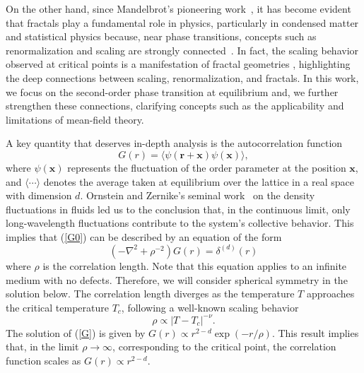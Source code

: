 \documentclass[pre,aps,twocolumn,showpacs,floatfix,nofootinbib,superscriptaddress,linenumbers]{revtex4-1}
\renewcommand{\vec}{\mathbf}
\begin{document}
On the other hand, since Mandelbrot's pioneering work~\cite{Mandelbrot82}, it has become evident that fractals play a fundamental role in physics, particularly in condensed matter and statistical physics because, near phase transitions, concepts such as renormalization and scaling are strongly connected~\cite{Cardy96}. In fact, the scaling behavior observed at critical points is a manifestation of fractal geometries \cite{Suzuki8, Kroger00,Devakul19}, highlighting the deep connections between scaling, renormalization, and fractals. In this work,  we focus on the second-order phase transition at equilibrium and, we further strengthen these connections, clarifying concepts such as the applicability and limitations of mean-field theory. 

A key quantity that deserves in-depth analysis is the autocorrelation function
\begin{equation}
\label{G0}
    G(r)=\langle \psi(\vec{r}+\vec{x})\psi(\vec{x})\rangle,
\end{equation}
where $\psi(\vec{x})$ represents the fluctuation of the order parameter at the position $\vec{x}$, and $\langle \cdots\rangle$ denotes the average taken at equilibrium over the lattice in a real space with dimension $d$. Ornstein and Zernike's seminal work~\cite{Ornstein14} on the density fluctuations in fluids led us to the conclusion that, in the continuous limit, only long-wavelength fluctuations contribute to the system's collective behavior. This implies that (\ref{G0}) can be described by an equation of the form ~\cite{Kardar07} 
\begin{equation}
\label{G}
 (-\nabla^2 +\rho^{-2})G(r)=\delta^{(d)}(r)   
\end{equation} 
where $\rho$ is the correlation length. Note that this equation applies to an infinite medium with no defects. Therefore, we will consider spherical symmetry in the solution below. The correlation length diverges as the temperature $T$ approaches the critical temperature $T_c$, following a well-known scaling behavior~\cite{Kardar07,Cardy96}
\begin{equation}
\label{rhodivergence}
\rho \propto |T-T_c|^{-\nu}.
\end{equation}
The solution of (\ref{G}) is given by $G(r)\propto r^{2-d} \exp(-r/\rho)$. This result implies that, in the limit $\rho \rightarrow \infty $, corresponding to the critical point, the correlation function scales as $G(r) \propto r^{2-d} $.
\end{document}
